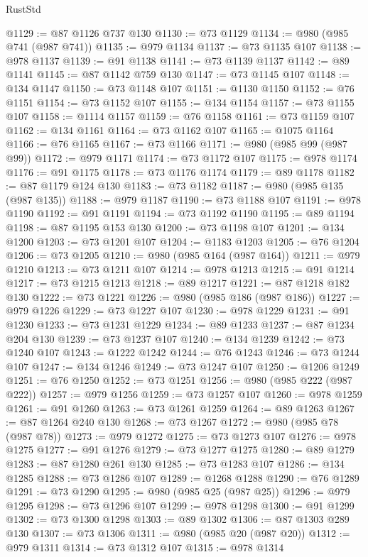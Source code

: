 \begin{lexlean}{RustStd}
\begin{coremodule}
{\begin{coremodule}
{{{{{@1129 := @87 @1126 @737 @130
@1130 := @73 @1129
@1134 := @980 (@985 @741 (@987 @741))
@1135 := @979 @1134
@1137 := @73 @1135 @107
@1138 := @978 @1137
@1139 := @91 @1138
@1141 := @73 @1139 @1137
@1142 := @89 @1141
@1145 := @87 @1142 @759 @130
@1147 := @73 @1145 @107
@1148 := @134 @1147
@1150 := @73 @1148 @107
@1151 := @1130 @1150
@1152 := @76 @1151
@1154 := @73 @1152 @107
@1155 := @134 @1154
@1157 := @73 @1155 @107
@1158 := @1114 @1157
@1159 := @76 @1158
@1161 := @73 @1159 @107
@1162 := @134 @1161
@1164 := @73 @1162 @107
@1165 := @1075 @1164
@1166 := @76 @1165
@1167 := @73 @1166
@1171 := @980 (@985 @99 (@987 @99))
@1172 := @979 @1171
@1174 := @73 @1172 @107
@1175 := @978 @1174
@1176 := @91 @1175
@1178 := @73 @1176 @1174
@1179 := @89 @1178
@1182 := @87 @1179 @124 @130
@1183 := @73 @1182
@1187 := @980 (@985 @135 (@987 @135))
@1188 := @979 @1187
@1190 := @73 @1188 @107
@1191 := @978 @1190
@1192 := @91 @1191
@1194 := @73 @1192 @1190
@1195 := @89 @1194
@1198 := @87 @1195 @153 @130
@1200 := @73 @1198 @107
@1201 := @134 @1200
@1203 := @73 @1201 @107
@1204 := @1183 @1203
@1205 := @76 @1204
@1206 := @73 @1205
@1210 := @980 (@985 @164 (@987 @164))
@1211 := @979 @1210
@1213 := @73 @1211 @107
@1214 := @978 @1213
@1215 := @91 @1214
@1217 := @73 @1215 @1213
@1218 := @89 @1217
@1221 := @87 @1218 @182 @130
@1222 := @73 @1221
@1226 := @980 (@985 @186 (@987 @186))
@1227 := @979 @1226
@1229 := @73 @1227 @107
@1230 := @978 @1229
@1231 := @91 @1230
@1233 := @73 @1231 @1229
@1234 := @89 @1233
@1237 := @87 @1234 @204 @130
@1239 := @73 @1237 @107
@1240 := @134 @1239
@1242 := @73 @1240 @107
@1243 := @1222 @1242
@1244 := @76 @1243
@1246 := @73 @1244 @107
@1247 := @134 @1246
@1249 := @73 @1247 @107
@1250 := @1206 @1249
@1251 := @76 @1250
@1252 := @73 @1251
@1256 := @980 (@985 @222 (@987 @222))
@1257 := @979 @1256
@1259 := @73 @1257 @107
@1260 := @978 @1259
@1261 := @91 @1260
@1263 := @73 @1261 @1259
@1264 := @89 @1263
@1267 := @87 @1264 @240 @130
@1268 := @73 @1267
@1272 := @980 (@985 @78 (@987 @78))
@1273 := @979 @1272
@1275 := @73 @1273 @107
@1276 := @978 @1275
@1277 := @91 @1276
@1279 := @73 @1277 @1275
@1280 := @89 @1279
@1283 := @87 @1280 @261 @130
@1285 := @73 @1283 @107
@1286 := @134 @1285
@1288 := @73 @1286 @107
@1289 := @1268 @1288
@1290 := @76 @1289
@1291 := @73 @1290
@1295 := @980 (@985 @25 (@987 @25))
@1296 := @979 @1295
@1298 := @73 @1296 @107
@1299 := @978 @1298
@1300 := @91 @1299
@1302 := @73 @1300 @1298
@1303 := @89 @1302
@1306 := @87 @1303 @289 @130
@1307 := @73 @1306
@1311 := @980 (@985 @20 (@987 @20))
@1312 := @979 @1311
@1314 := @73 @1312 @107
@1315 := @978 @1314
}}}}}
\end{coremodule}}
\end{coremodule}
\end{lexlean}
